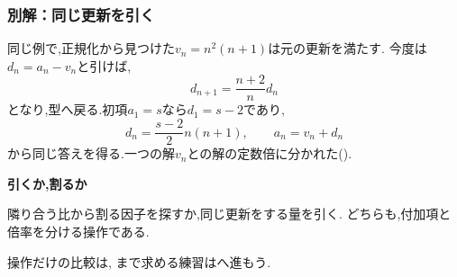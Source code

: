   \subsubsection{別解：同じ更新を引く}
  同じ例で,正規化から見つけた$v_n=n^2(n+1)$は元の更新を満たす.
  今度は$d_n=a_n-v_n$と引けば,
  \[
    d_{n+1}=\frac{n+2}{n}d_n
  \]
  となり,型へ戻る.初項$a_1=s$なら$d_1=s-2$であり,
  \[
    d_n=\frac{s-2}{2}n(n+1),\qquad a_n=v_n+d_n
  \]
  から同じ答えを得る.一つの解$v_n$との解の定数倍に分かれた().

  \begin{bookpoint}
    \textbf{引くか,割るか}\par
    隣り合う比から割る因子を探すか,同じ更新をする量を引く.
    どちらも,付加項と倍率を分ける操作である.
  \end{bookpoint}
  操作だけの比較は,
  まで求める練習はへ進もう.
